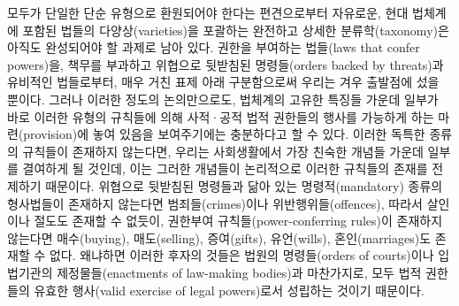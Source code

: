 모두가 단일한 단순 유형으로  환원되어야 한다는
편견으로부터 자유로운, 현대 법체계에 포함된 법들의 다양상(varieties)을
포괄하는 완전하고 상세한 분류학(taxonomy)은 아직도 완성되어야 할 과제로
남아 있다. 권한을 부여하는 법들(laws that confer powers)을, 책무를
부과하고 위협으로 뒷받침된 명령들(orders backed by threats)과 유비적인
법들로부터, 매우 거친 표제 아래 구분함으로써 우리는 겨우 출발점에 섰을
뿐이다. 그러나 이러한 정도의 논의만으로도, 법체계의 고유한 특징들 가운데
일부가 바로 이러한 유형의 규칙들에 의해 사적·공적 법적 권한들의 행사를
가능하게 하는 마련(provision)에 놓여 있음을 보여주기에는 충분하다고 할
수 있다. 이러한 독특한 종류의 규칙들이 존재하지 않는다면, 우리는
사회생활에서 가장 친숙한 개념들 가운데 일부를 결여하게 될 것인데, 이는
그러한 개념들이 논리적으로 이러한 규칙들의 존재를 전제하기 때문이다.
위협으로 뒷받침된 명령들과 닮아 있는 명령적(mandatory) 종류의 형사법들이
존재하지 않는다면 범죄들(crimes)이나 위반행위들(offences), 따라서
살인이나 절도도 존재할 수 없듯이, 권한부여 규칙들(power-conferring
rules)이 존재하지 않는다면 매수(buying), 매도(selling), 증여(gifts),
유언(wills), 혼인(marriages)도 존재할 수 없다. 왜냐하면 이러한 후자의
것들은 법원의 명령들(orders of courts)이나 입법기관의
제정물들(enactments of law-making bodies)과 마찬가지로, 모두 법적
권한들의 유효한 행사(valid exercise of legal powers)로서 성립하는 것이기
때문이다.


